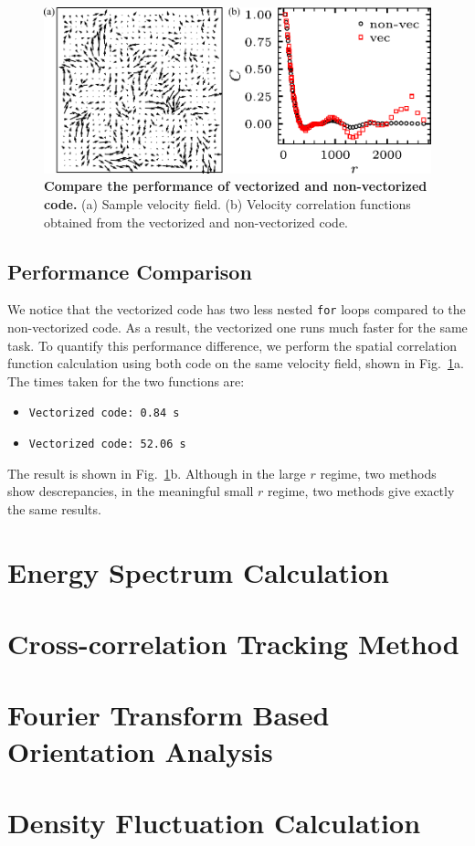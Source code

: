 \begin{figure}[!ht]
	\begin{center}
	\includegraphics[width=5.5in]{Figs/A-2/vectorization.pdf}
	\end{center}
	\caption[Compare the performance of vectorized and non-vectorized code]
	{
	\textbf{Compare the performance of vectorized and non-vectorized code.}
  (a) Sample velocity field.
  (b) Velocity correlation functions obtained from the vectorized and non-vectorized code.
	}
	\label{fig:vectorization-performance}
\end{figure}


\subsection{Performance Comparison}
We notice that the vectorized code has two less nested \texttt{for} loops compared to the non-vectorized code. As a result, the vectorized one runs much faster for the same task. To quantify this performance difference, we perform the spatial correlation function calculation using both code on the same velocity field, shown in Fig.~\ref{fig:vectorization-performance}a. The times taken for the two functions are:
\begin{itemize}
  \item \texttt{Vectorized code: 0.84 s}
  \item \texttt{Vectorized code: 52.06 s}
\end{itemize}
The result is shown in Fig.~\ref{fig:vectorization-performance}b. Although in the large $r$ regime, two methods show descrepancies, in the meaningful small $r$ regime, two methods give exactly the same results.


\section{Energy Spectrum Calculation}

\section{Cross-correlation Tracking Method}
\label{cross-correlation-tracking-method}

\section{Fourier Transform Based Orientation Analysis}
\label{fourier-transform-based-orientation-analysis}

\section{Density Fluctuation Calculation}

